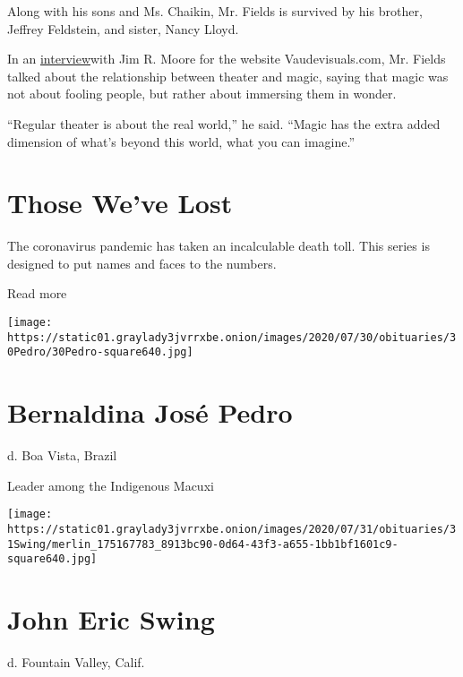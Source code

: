 Along with his sons and Ms. Chaikin, Mr. Fields is survived by his
brother, Jeffrey Feldstein, and sister, Nancy Lloyd.

In an
\href{https://vaudevisuals.com/category/tribute-to-bradley-fields-magician-director-and-mime/}{interview}with
Jim R. Moore for the website Vaudevisuals.com, Mr. Fields talked about
the relationship between theater and magic, saying that magic was not
about fooling people, but rather about immersing them in wonder.

``Regular theater is about the real world,'' he said. ``Magic has the
extra added dimension of what's beyond this world, what you can
imagine.''

\href{https://www.nytimes3xbfgragh.onion/interactive/2020/obituaries/people-died-coronavirus-obituaries.html?action=click\&pgtype=Article\&state=default\&region=BELOW_MAIN_CONTENT\&context=covid_obits_promo}{}

\hypertarget{those-weve-lost}{%
\section{Those We've Lost}\label{those-weve-lost}}

The coronavirus pandemic has taken an incalculable death toll. This
series is designed to put names and faces to the numbers.

Read more

\texttt{[image: https://static01.graylady3jvrrxbe.onion/images/2020/07/30/obituaries/30Pedro/30Pedro-square640.jpg]}

\hypertarget{bernaldina-josuxe9-pedro}{%
\section{Bernaldina José Pedro}\label{bernaldina-josuxe9-pedro}}

d. Boa Vista, Brazil

Leader among the Indigenous Macuxi

\texttt{[image: https://static01.graylady3jvrrxbe.onion/images/2020/07/31/obituaries/31Swing/merlin\_175167783\_8913bc90-0d64-43f3-a655-1bb1bf1601c9-square640.jpg]}

\hypertarget{john-eric-swing}{%
\section{John Eric Swing}\label{john-eric-swing}}

d. Fountain Valley, Calif.

